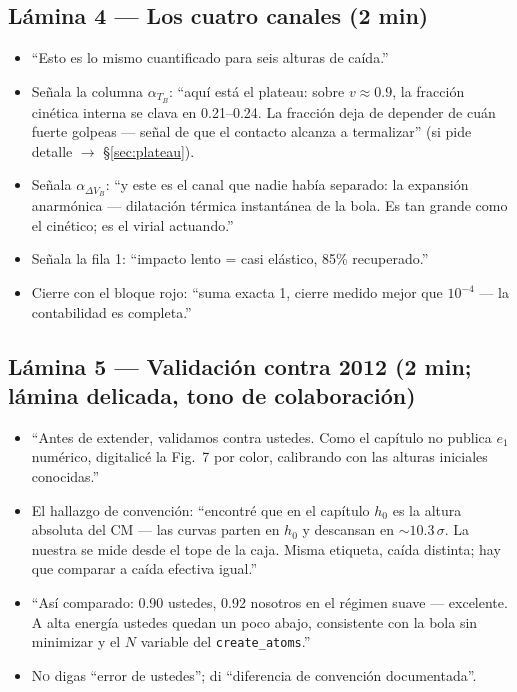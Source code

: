\documentclass[11pt,a4paper]{article}
\begin{document}
\subsection*{Lámina 4 --- Los cuatro canales (2 min)}
\begin{itemize}[leftmargin=1.4em]
    \item ``Esto es lo mismo cuantificado para seis alturas de caída.''
    \item Señala la columna $\alpha_{T_B}$: ``aquí está el plateau: sobre
    $v\approx0.9$, la fracción cinética interna se clava en 0.21--0.24.
    La fracción deja de depender de cuán fuerte golpeas --- señal de que
    el contacto alcanza a termalizar'' (si pide detalle $\to$
    \S\ref{sec:plateau}).
    \item Señala $\alpha_{\Delta V_B}$: ``y este es el canal que nadie
    había separado: la expansión anarmónica --- dilatación térmica
    instantánea de la bola. Es tan grande como el cinético; es el virial
    actuando.''
    \item Señala la fila 1: ``impacto lento = casi elástico, 85\%
    recuperado.''
    \item Cierre con el bloque rojo: ``suma exacta 1, cierre medido mejor
    que $10^{-4}$ --- la contabilidad es completa.''
\end{itemize}

\subsection*{Lámina 5 --- Validación contra 2012 (2 min; lámina delicada, tono de colaboración)}
\begin{itemize}[leftmargin=1.4em]
    \item ``Antes de extender, validamos contra ustedes. Como el capítulo
    no publica $e_1$ numérico, digitalicé la Fig.~7 por color, calibrando
    con las alturas iniciales conocidas.''
    \item El hallazgo de convención: ``encontré que en el capítulo $h_0$
    es la altura absoluta del CM --- las curvas parten en $h_0$ y
    descansan en $\sim10.3\,\sigma$. La nuestra se mide desde el tope de
    la caja. Misma etiqueta, caída distinta; hay que comparar a caída
    efectiva igual.''
    \item ``Así comparado: 0.90 ustedes, 0.92 nosotros en el régimen
    suave --- excelente. A alta energía ustedes quedan un poco abajo,
    consistente con la bola sin minimizar y el $N$ variable del
    \texttt{create\_atoms}.''
    \item \textsc{No} digas ``error de ustedes''; di ``diferencia de
    convención documentada''.
\end{itemize}
\end{document}

